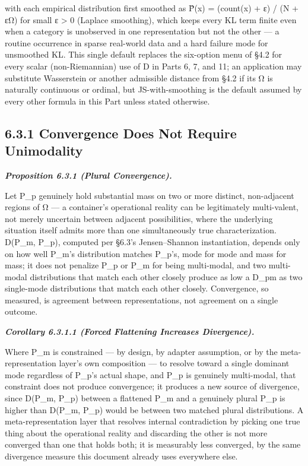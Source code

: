 \documentclass[
]{article}
\begin{document}
with each empirical distribution first smoothed as P̂(x) = (count(x) + ε)
/ (N + ε\textbar Ω\textbar) for small ε \textgreater{} 0 (Laplace
smoothing), which keeps every KL term finite even when a category is
unobserved in one representation but not the other --- a routine
occurrence in sparse real-world data and a hard failure mode for
unsmoothed KL. This single default replaces the six-option menu of §4.2
for every scalar (non-Riemannian) use of D in Parts 6, 7, and 11; an
application may substitute Wasserstein or another admissible distance
from §4.2 if its Ω is naturally continuous or ordinal, but
JS-with-smoothing is the default assumed by every other formula in this
Part unless stated otherwise.

\hypertarget{convergence-does-not-require-unimodality}{%
\subsection{6.3.1 Convergence Does Not Require
Unimodality}\label{convergence-does-not-require-unimodality}}

\emph{\textbf{Proposition 6.3.1 (Plural Convergence).}}

Let P\_p genuinely hold substantial mass on two or more distinct,
non-adjacent regions of Ω --- a container's operational reality can be
legitimately multi-valent, not merely uncertain between adjacent
possibilities, where the underlying situation itself admits more than
one simultaneously true characterization. D(P\_m, P\_p), computed per
§6.3's Jensen--Shannon instantiation, depends only on how well P\_m's
distribution matches P\_p's, mode for mode and mass for mass; it does
not penalize P\_p or P\_m for being multi-modal, and two multi-modal
distributions that match each other closely produce as low a D\_pm as
two single-mode distributions that match each other closely.
Convergence, so measured, is agreement between representations, not
agreement on a single outcome.

\emph{\textbf{Corollary 6.3.1.1 (Forced Flattening Increases
Divergence).}}

Where P\_m is constrained --- by design, by adapter assumption, or by
the meta-representation layer's own composition --- to resolve toward a
single dominant mode regardless of P\_p's actual shape, and P\_p is
genuinely multi-modal, that constraint does not produce convergence; it
produces a new source of divergence, since D(P\_m, P\_p) between a
flattened P\_m and a genuinely plural P\_p is higher than D(P\_m, P\_p)
would be between two matched plural distributions. A meta-representation
layer that resolves internal contradiction by picking one true thing
about the operational reality and discarding the other is not more
converged than one that holds both; it is measurably less converged, by
the same divergence measure this document already uses everywhere else.
\end{document}

